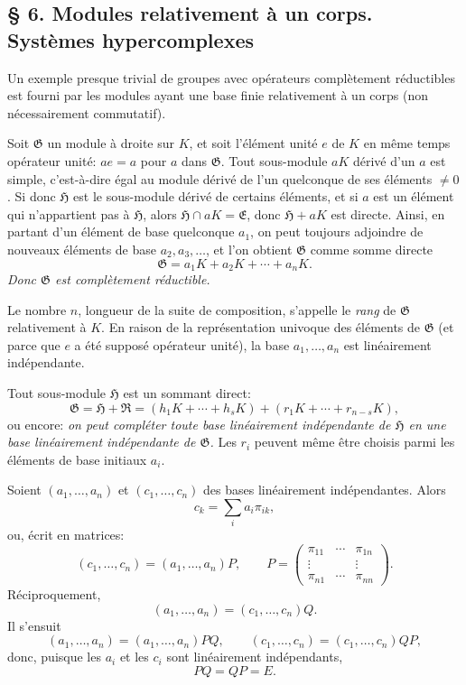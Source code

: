 
\providecommand{\mG}{\mathfrak{G}}
\providecommand{\mE}{\mathfrak{E}}
\providecommand{\mH}{\mathfrak{H}}
\providecommand{\mR}{\mathfrak{R}}
\providecommand{\mo}{\mathfrak{o}}

\subsection*{\S{} 6. Modules relativement à un corps. Systèmes hypercomplexes}

Un exemple presque trivial de groupes avec opérateurs complètement réductibles est fourni par les modules ayant une base finie relativement à un corps (non nécessairement commutatif).

Soit $\mG$ un module à droite sur $K$, et soit l'élément unité $e$ de $K$ en même temps opérateur unité: $ae=a$ pour $a$ dans $\mG$. Tout sous-module $aK$ dérivé d'un $a$ est simple, c'est-à-dire égal au module dérivé de l'un quelconque de ses éléments $\ne0$. Si donc $\mH$ est le sous-module dérivé de certains éléments, et si $a$ est un élément qui n'appartient pas à $\mH$, alors $\mH\cap aK=\mE$, donc $\mH+aK$ est directe. Ainsi, en partant d'un élément de base quelconque $a_1$, on peut toujours adjoindre de nouveaux éléments de base $a_2,a_3,\ldots$, et l'on obtient $\mG$ comme somme directe
\[
        \mG=a_1K+a_2K+\cdots+a_nK.
\]
\emph{Donc $\mG$ est complètement réductible.}

Le nombre $n$, longueur de la suite de composition, s'appelle le \emph{rang} de $\mG$ relativement à $K$. En raison de la représentation univoque des éléments de $\mG$ (et parce que $e$ a été supposé opérateur unité), la base $a_1,\ldots,a_n$ est linéairement indépendante.

Tout sous-module $\mH$ est un sommant direct:
\[
        \mG=\mH+\mR=(h_1K+\cdots+h_sK)+(r_1K+\cdots+r_{n-s}K),
\]
ou encore: \emph{on peut compléter toute base linéairement indépendante de $\mH$ en une base linéairement indépendante de $\mG$.} Les $r_i$ peuvent même être choisis parmi les éléments de base initiaux $a_i$.

Soient $(a_1,\ldots,a_n)$ et $(c_1,\ldots,c_n)$ des bases linéairement indépendantes. Alors
\[
        c_k=\sum_i a_i\pi_{ik},
\]
ou, écrit en matrices:
\[
        (c_1,\ldots,c_n)=(a_1,\ldots,a_n)P,
        \qquad
        P=\begin{pmatrix}
        \pi_{11}&\cdots&\pi_{1n}\\
        \vdots&&\vdots\\
        \pi_{n1}&\cdots&\pi_{nn}
        \end{pmatrix}.
\]
Réciproquement,
\[
        (a_1,\ldots,a_n)=(c_1,\ldots,c_n)Q.
\]
Il s'ensuit
\[
        (a_1,\ldots,a_n)=(a_1,\ldots,a_n)PQ,
        \qquad
        (c_1,\ldots,c_n)=(c_1,\ldots,c_n)QP,
\]
donc, puisque les $a_i$ et les $c_i$ sont linéairement indépendants,
\[
        PQ=QP=E.
\]

